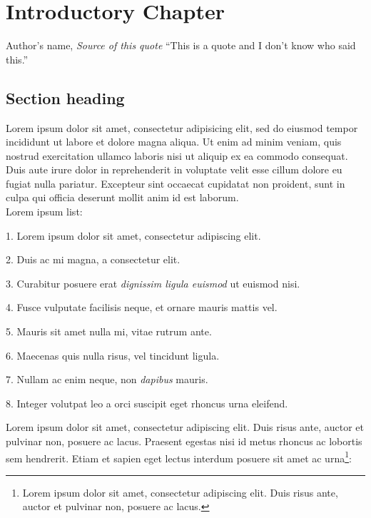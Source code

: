 
\chapter{Introductory Chapter}

\begin{chapquote}{Author's name, \textit{Source of this quote}}
``This is a quote and I don't know who said this.''
\end{chapquote}

\section{Section heading}
Lorem ipsum dolor sit amet, consectetur adipisicing elit, sed do eiusmod tempor incididunt ut labore et dolore magna aliqua. Ut enim ad minim veniam, quis nostrud exercitation ullamco laboris nisi ut aliquip ex ea commodo consequat. \\ Duis aute irure dolor in reprehenderit in voluptate velit esse cillum dolore eu fugiat nulla pariatur. Excepteur sint occaecat cupidatat non proident, sunt in culpa qui officia deserunt mollit anim id est laborum. \\ Lorem ipsum list:

1. Lorem ipsum dolor sit amet, consectetur adipiscing elit.

2. Duis ac mi magna, a consectetur elit.

3. Curabitur posuere erat \emph{dignissim ligula euismod} ut euismod nisi.

4. Fusce vulputate facilisis neque, et ornare mauris mattis vel.

5. Mauris sit amet nulla mi, vitae rutrum ante.

6. Maecenas quis nulla risus, vel tincidunt ligula.

7. Nullam ac enim neque, non \emph{dapibus} mauris.

8. Integer volutpat leo a orci suscipit eget rhoncus urna eleifend.

\noindent Lorem ipsum dolor sit amet, consectetur adipiscing elit. Duis risus ante, auctor et pulvinar non, posuere ac lacus. Praesent egestas nisi id metus rhoncus ac lobortis sem hendrerit. Etiam et sapien eget lectus interdum posuere sit amet ac urna\footnote{Lorem ipsum dolor sit amet, consectetur adipiscing elit. Duis risus ante, auctor et pulvinar non, posuere ac lacus.}:

